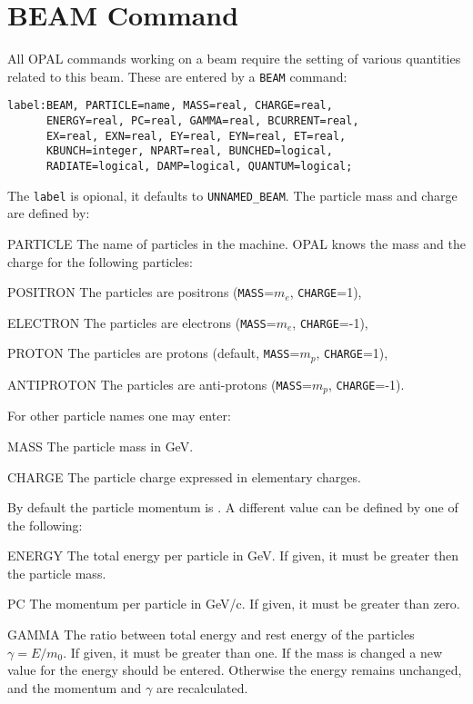 \section{BEAM Command}
\label{sec:beam}
All OPAL commands working on a beam require the setting of various
quantities related to this beam. 
These are entered by a \texttt{BEAM} command:
\begin{verbatim}
label:BEAM, PARTICLE=name, MASS=real, CHARGE=real,
      ENERGY=real, PC=real, GAMMA=real, BCURRENT=real,
      EX=real, EXN=real, EY=real, EYN=real, ET=real,
      KBUNCH=integer, NPART=real, BUNCHED=logical,
      RADIATE=logical, DAMP=logical, QUANTUM=logical;
\end{verbatim}
The \texttt{label} is opional, it defaults to \texttt{UNNAMED\_BEAM}.
The particle mass and charge are defined by:
\begin{description}
\item{PARTICLE}
  The name of particles in the machine.
  OPAL knows the mass and the charge for the following particles:
  \begin{description}
  \item{POSITRON}
    The particles are positrons (\texttt{MASS}=$m_e$,
    \texttt{CHARGE}=1),
  \item{ELECTRON}
    The particles are electrons (\texttt{MASS}=$m_e$,
    \texttt{CHARGE}=-1),
  \item{PROTON}
    The particles are protons (default, \texttt{MASS}=$m_p$,
    \texttt{CHARGE}=1),
  \item{ANTIPROTON}
    The particles are anti-protons (\texttt{MASS}=$m_p$,
    \texttt{CHARGE}=-1).
  \end{description}
\end{description}
For other particle names one may enter:
\begin{description}
\item{MASS}
  The particle mass in GeV.
\item{CHARGE}
  The particle charge expressed in elementary charges.
\end{description}
By default the particle momentum is .
A different value can be defined by one of the following:
\begin{description}
\item{ENERGY}
  The total energy per particle in GeV.
  If given, it must be greater then the particle mass.
\item{PC}
  The momentum per particle in GeV/c.
  If given, it must be greater than zero.
\item{GAMMA}
  The ratio between total energy and rest energy of the particles
  $\gamma = E / m_0$.
  If given, it must be greater than one.
  If the mass is changed a new value for the energy should be entered.
  Otherwise the energy remains unchanged,
  and the momentum and $\gamma$ are recalculated.
\end{description}

